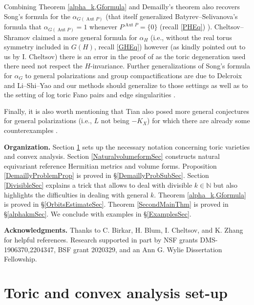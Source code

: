 \documentclass{article}
\newcommand{\NN}{{\mathbb N}}
\renewcommand{\>}{\rightarrow}
\DeclareMathOperator{\Aut}{Aut}
\theoremstyle{plain}
\theoremstyle{definition}
\def\lb#1{\label{#1}}
\begin{document}
Combining Theorem \ref{alpha_k,Gformula} and Demailly's theorem \cite[(A.1)]{CS08}
also recovers 
Song's formula for the $\alpha_{G(\Aut P)}$
(that itself generalized Batyrev--Selivanova's formula that 
$\alpha_{G(\Aut P)}=1$ whenever $P^{\Aut P}=\{0\}$ (recall \eqref{PHEq}) \cite[Theorem 1.1, p. 233]{BS99}).
Cheltsov--Shramov claimed a more general formula for 
$\alpha_{H}$ 
(i.e., without the real torus symmetry included in $G(H)$, recall \eqref{GHEq})
however (as kindly pointed out to us by I. Cheltsov) 
there is an error in the proof of \cite[Lemma 5.1]{CS08}
as the toric degeneration used there need not respect the $H$-invariance. 
Further generalizations of Song's formula for $\alpha_G$ to general polarizations and group compactifications
are due to Delcroix \cite{Delcroix15,Delcroix17}
and Li--Shi--Yao
\cite{LSY15}
and our methods should generalize
to those settings as well as to the setting of log toric Fano pairs and edge singularities
\cite[\S6--7]{CR15}. 

Finally, it is also worth mentioning that Tian also posed more general
conjectures \cite[Conjecture 5.4]{Tian12}
for general polarizations (i.e., $L$ not being $-K_X$) 
for which there are already some counterexamples \cite{ACS}.
        

\bigskip
\noindent
{\bf Organization.}
Section \ref{ToricSec} sets up the necessary notation concerning
toric varieties and convex analysis. Section
\ref{NaturalvolumeformSec}
constructs natural equivariant reference Hermitian metrics and volume forms.
Proposition \ref{DemaillyProblemProp} is proved in \S\ref{DemaillyProbSubSec}.
Section \ref{DivisibleSec} explains a trick that allows to 
deal with divisible $k\in\NN$ but also highlights the difficulties
in dealing with general $k$.
Theorem \ref{alpha_k,Gformula} is proved in \S\ref{OrbitsEstimateSec}.
Theorem \ref{SecondMainThm} is proved in \S\ref{alphakmSec}.
We conclude with examples in \S\ref{ExamplesSec}.

\bigskip
\noindent
{\bf Acknowledgments.} 
Thanks to C. Birkar, H. Blum, I. Cheltsov, and K. Zhang for helpful references.
Research supported in part 
by NSF grants DMS-1906370,2204347, BSF
grant 2020329, and an
Ann G. Wylie Dissertation Fellowship.

\section{Toric and convex analysis set-up}
\lb{ToricSec}
\end{document}
